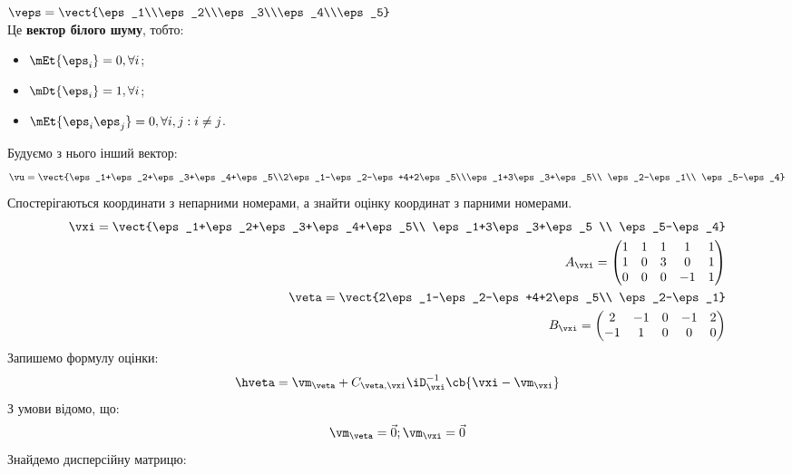 \begin{tsk}
$\veps=\vect{\eps_1\\\eps_2\\\eps_3\\\eps_4\\\eps_5}$\\
Це \textbf{вектор білого шуму}, тобто:
\begin{itemize}
\item $\mEt{\eps_i}=0,\forall i$;
\item $\mDt{\eps_i}=1,\forall i$;
\item $\mEt{\eps_i\eps_j}=0,\forall i,j:i\neq j$.
\end{itemize}
Будуємо з нього інший вектор:
\begin{equation}
\vu = \vect{\eps_1+\eps_2+\eps_3+\eps_4+\eps_5\\2\eps_1-\eps_2-\eps+4+2\eps_5\\\eps_1+3\eps_3+\eps_5\\ \eps_2-\eps_1\\ \eps_5-\eps_4}
\end{equation}
Спостерігаються координати з непарними номерами, а знайти оцінку координат з парними номерами.
\begin{eqnarray}
\vxi=\vect{\eps_1+\eps_2+\eps_3+\eps_4+\eps_5\\ \eps_1+3\eps_3+\eps_5 \\ \eps_5-\eps_4}\\
A_{\vxi} = \begin{pmatrix}
1 & 1 & 1 & 1 & 1 \\
1 & 0 & 3 & 0 & 1\\
0 & 0 & 0 & -1 & 1
\end{pmatrix}\\
\veta = \vect{2\eps_1-\eps_2-\eps+4+2\eps_5\\ \eps_2-\eps_1}\\
B_{\vxi} = \begin{pmatrix}
2 & -1 & 0 & -1 & 2 \\
-1 & 1 & 0 & 0 & 0
\end{pmatrix}
\end{eqnarray}
Запишемо формулу оцінки:
\begin{equation}
\hveta = \vm_{\veta} + C_{\veta,\vxi} \iD_{\vxi}^{-1} \cb{\vxi-\vm_{\vxi}}
\end{equation}
З умови відомо, що:
\begin{equation}
\vm_{\veta}=\vec 0;\vm_{\vxi} = \vec 0
\end{equation}
Знайдемо дисперсійну матрицю:

\end{tsk}
